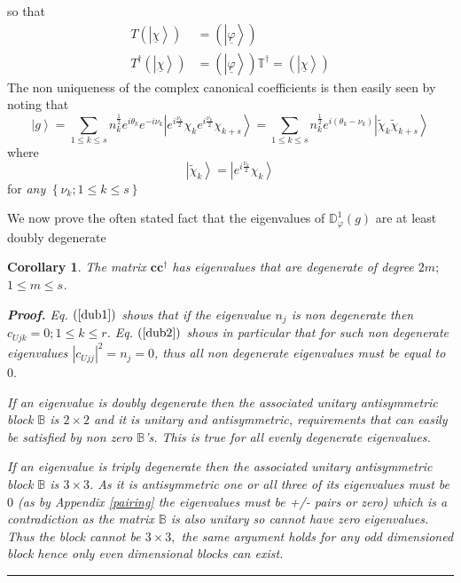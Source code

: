\documentclass[aps,preprint]{revtex4}%
\newtheorem{corollary}[theorem]{Corollary}
\newenvironment{proof}[1][Proof]{\noindent\textbf{#1.} }{\ \rule{0.5em}{0.5em}}
\begin{document}
so that
\begin{align}
T\left(  \left\vert \underline{\chi}\right\rangle \right)   &  =\left(
\left\vert \underline{\varphi}\right\rangle \right)  \nonumber\\
T^{\dagger}\left(  \left\vert \underline{\chi}\right\rangle \right)   &
=\left(  \left\vert \underline{\varphi}\right\rangle \right)  \mathbb{T}%
^{\dagger}=\left(  \left\vert \underline{\chi}\right\rangle \right)
\end{align}
The non uniqueness of the complex canonical coefficients is then easily seen
by noting that
\begin{equation}
\left\vert g\right\rangle =\sum_{1\leq k\leq s}n_{k}^{\frac{1}{2}}%
e^{i\theta_{k}}e^{-i\nu_{k}}\left\vert e^{i\frac{\nu_{k}}{2}}\chi_{k}%
e^{i\frac{\nu_{k}}{2}}\chi_{k+s}\right\rangle =\sum_{1\leq k\leq s}%
n_{k}^{\frac{1}{2}}e^{i\left(  \theta_{k}-\nu_{k}\right)  }\left\vert
\tilde{\chi}_{k}\tilde{\chi}_{k+s}\right\rangle
\end{equation}
where
\begin{equation}
\left\vert \tilde{\chi}_{k}\right\rangle =\left\vert e^{i\frac{\nu_{k}}{2}%
}\chi_{k}\right\rangle
\end{equation}
for \emph{any }$\left\{  \nu_{k};1\leq k\leq s\right\}  $

We now prove the often stated fact that the eigenvalues of $\mathbb{D}%
_{\varphi}^{1}\left(  g\right)  $ are at least doubly degenerate

\begin{corollary}
The matrix $\mathbf{cc}^{\dagger}$ has eigenvalues that are degenerate of
degree $2m;$ $1\leq m\leq s$.

\begin{proof}
Eq. $\left(  \ref{dub1}\right)  $ shows that if the eigenvalue $n_{j}$ is non
degenerate then $c_{Ujk}=0;1\leq k\leq r$. Eq. $\left(  \ref{dub2}\right)  $
shows in particular that for such non degenerate eigenvalues $\left\vert
c_{Ujj}\right\vert ^{2}=n_{j}=0$, thus all non degenerate eigenvalues must be
equal to $0.$

If an eigenvalue is doubly degenerate then the associated unitary
antisymmetric block $\mathbb{B}$ is $2\times2$ and it is unitary and
antisymmetric, requirements that can easily be satisfied by non zero
$\mathbb{B}$'s. This is true for all evenly degenerate eigenvalues.

If an eigenvalue is triply degenerate then the associated unitary
antisymmetric block $\mathbb{B}$ is $3\times3$. As it is antisymmetric one or
all three of its eigenvalues must be $0$ (as by Appendix \ref{pairing} the
eigenvalues must be +/- pairs or zero) which is a contradiction as the matrix
$\mathbb{B}$ is also unitary so cannot have zero eigenvalues. Thus the block
cannot be $3\times3,$ the same argument holds for any odd dimensioned block
hence only even dimensional blocks can exist.
\end{proof}
\end{corollary}
\end{document}
